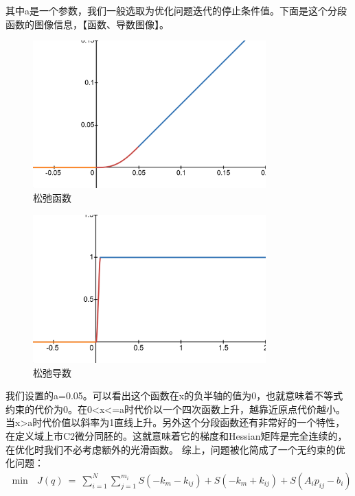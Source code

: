\documentclass[master,academic]{ysuthesis} %
\begin{document}
		其中a是一个参数，我们一般选取为优化问题迭代的停止条件值。下面是这个分段函数的图像信息，【函数、导数图像】。
		\begin{figure}[!ht]
			\centering
			\includegraphics[width=0.8\textwidth]{松弛函数.png}
			\caption{松弛函数}
			\label{fig:松弛函数}
		\end{figure}
		\begin{figure}[!ht]
			\centering
			\includegraphics[width=0.8\textwidth]{松弛导数.png}
			\caption{松弛导数}
			\label{fig:松弛导数}
		\end{figure}
		我们设置的a=0.05。可以看出这个函数在x的负半轴的值为0，也就意味着不等式约束的代价为0。在0<x<=a时代价以一个四次函数上升，越靠近原点代价越小。当x>a时代价值以斜率为1直线上升。另外这个分段函数还有非常好的一个特性，在定义域上市C2微分同胚的。这就意味着它的梯度和Hessian矩阵是完全连续的，在优化时我们不必考虑额外的光滑函数。
		综上，问题被化简成了一个无约束的优化问题：
		\begin{equation}
			\begin{aligned}
				\min\text{\ }J( q ) \ =\ \sum_{i=1}^N{\sum_{j=1}^{m_i}{S( -k_m-k_{ij} ) +S( -k_m+k_{ij} ) +S( A_ip_{ij}-b_i )}}
			\end{aligned}
		\end{equation}
\end{document}
